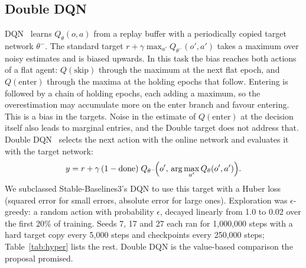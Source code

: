 \documentclass[12pt,a4paper]{article}
\begin{document}
\subsection{Double DQN}\label{sec:ddqn}
DQN~\cite{dqn} learns $Q_\theta(o,a)$ from a replay buffer with a periodically copied target
network $\theta^-$. The standard target $r+\gamma\max_{a'}Q_{\theta^-}(o',a')$ takes a maximum
over noisy estimates and is biased upwards. In this task the bias reaches both actions of a
flat agent: $Q(\text{skip})$ through the maximum at the next flat epoch, and
$Q(\text{enter})$ through the maxima at the holding epochs that follow. Entering is followed
by a chain of holding epochs, each adding a maximum, so the overestimation may accumulate more
on the enter branch and favour entering. This is a bias in the targets. Noise in the estimate
of $Q(\text{enter})$ at the decision itself also leads to marginal entries, and the Double
target does not address that. Double DQN~\cite{ddqn} selects the next action with the online
network and evaluates it with the target network:
\begin{equation}
y=r+\gamma\,(1-\text{done})\;Q_{\theta^-}\!\Bigl(o',\,\arg\max_{a'}Q_\theta(o',a')\Bigr).
\label{eq:ddqn}
\end{equation}
We subclassed Stable-Baselines3's DQN to use this target with a Huber loss (squared error for
small errors, absolute error for large ones). Exploration was $\epsilon$-greedy: a random
action with probability $\epsilon$, decayed linearly from 1.0 to 0.02 over the first 20\% of
training. Seeds 7, 17 and 27 each ran for 1,000,000 steps with a hard target copy every 5,000
steps and checkpoints every 250,000 steps; Table~\ref{tab:hyper} lists the rest. Double DQN
is the value-based comparison the proposal promised.
\end{document}
